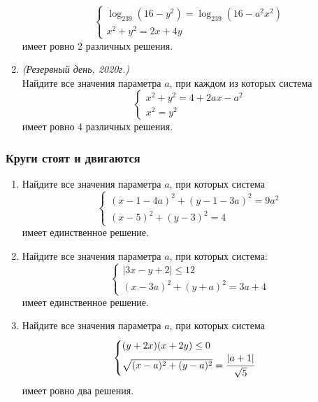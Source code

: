 \documentclass[12pt]{article}
\begin{document}
\begin{enumerate}[start=1,label={\itshape\bfseries \arabic*.}]
\begin{equation*}
\begin{cases}
            \log_{239}{(16 - y^2)} = \log_{239}{(16 - a^2x^2)}\\
            x^2 + y^2 = 2x + 4y
        \end{cases}
    \end{equation*}
    имеет ровно 2 различных решения.
    \item \textit{(Резервный день, 2020г.)}\\
    Найдите все значения параметра $a$, при каждом из которых система
    \begin{equation*}
        \begin{cases}
            x^2 + y^2 = 4 + 2ax - a^2\\
            x^2 = y^2
        \end{cases}
    \end{equation*}
    имеет ровно 4 различных решения.

\end{enumerate}
\subsubsection*{Круги стоят и двигаются}
 \begin{enumerate}[start=1,label={\itshape\bfseries \arabic*.}]
    \item Найдите все значения параметра $a$, при которых система
    \begin{equation*}
        \begin{cases}
            (x - 1 - 4a)^2 + (y - 1 - 3a)^2 = 9a^2 \\
            (x - 5)^2 + (y - 3)^2 = 4
        \end{cases}
    \end{equation*}
    имеет единственное решение.
    \item Найдите все значения параметра $a$, при которых система:
    \begin{equation*}
        \begin{cases}
            |3x - y + 2| \le 12\\
            (x - 3a)^2 + (y + a)^2 = 3a + 4
        \end{cases}
    \end{equation*}
    имеет единственное решение.
    \item Найдите все значения параметра $a$, при которых система
    \begin{equation*}
        \begin{cases}
            (y + 2x)(x + 2y) \le 0\\
            \sqrt{(x - a)^2 + (y - a)^2} = \cfrac{|a + 1|}{\sqrt{5}}
        \end{cases}
    \end{equation*}
    имеет ровно два решения.
\end{enumerate}
\end{document}
